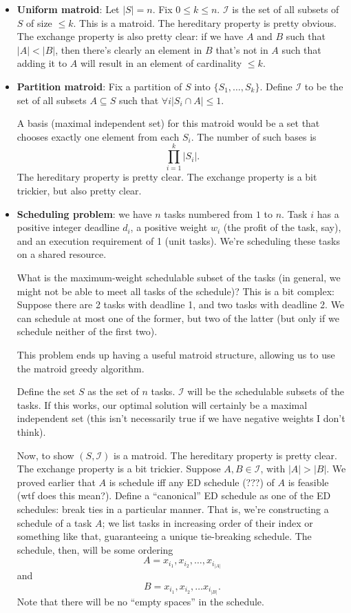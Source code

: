 \documentclass{article}
\begin{document}
\begin{itemize}
	\item \textbf{Uniform matroid}: Let $|S| = n$. 
	Fix $0\leq k \leq n$.
	$\mathcal I$ is the set of all subsets of $S$ of size $\leq k$.
	This is a matroid.
	The hereditary property is pretty obvious.
	The exchange property is also pretty clear: if we have $A$ and $B$
	such that $|A| < |B|$, then there's clearly an element in $B$ that's
	not in $A$ such that adding it to $A$ will result in an element of 
	cardinality $\leq k$.
	
	
	\item
	\textbf{Partition matroid}: 
	Fix a partition of $S$ into $\{S_1,\ldots, S_k\}$.
	Define $\mathcal I$ to be the set of all subsets $A\subseteq S$
	such that $\forall i |S_i\cap A| \leq 1$.
	
	A basis (maximal independent set) for this matroid
	would be a set that chooses exactly one element from each $S_i$.
	The number of such bases is
	$$
	\prod_{i=1}^k |S_i|.
	$$
	The hereditary property is pretty clear.
	The exchange property is a bit trickier, but also pretty clear.
	
	\item
	\textbf{Scheduling problem}: we have $n$ tasks
	numbered from $1$ to $n$.
	Task $i$ has a positive integer deadline $d_i$, a positive weight
	$w_i$ (the profit of the task, say), and an execution requirement
	of 1 (unit tasks). We're scheduling these tasks on a shared resource.
	
	What is the maximum-weight schedulable subset of the tasks (in general,
	we might not be able to meet all tasks of the schedule)?
	This is a bit complex: Suppose there are 2 tasks with deadline 1, 
	and two tasks with deadline 2. We can schedule
	at most one of the former, but two of the latter (but only if we
	schedule neither of the first two).
	
	This problem ends up having a useful matroid structure, allowing us to
	use the matroid greedy algorithm.
	
	Define the set $S$ as the set of $n$ tasks.
	$\mathcal I$ will be the schedulable subsets of the tasks.
	If this works, our optimal solution will certainly be a maximal 
	independent set (this isn't necessarily true if we have negative
	weights I don't think).
	
	Now, to show $(S,\mathcal I)$ is a matroid. The hereditary property
	is pretty clear.
	The exchange property is a bit trickier.
	Suppose $A,B\in\mathcal I$, with $|A| > |B|$.
	We proved earlier that $A$ is schedule iff any ED schedule (???) of
	$A$ is feasible (wtf does this mean?).
	Define a ``canonical'' ED schedule as one of the ED schedules: break
	ties in a particular manner.
	That is, we're constructing a schedule of a task $A$; we list tasks
	in increasing order of their index or something like that, guaranteeing
	a unique tie-breaking schedule.
	The schedule, then, will be some ordering
	$$
	A = x_{i_1}, x_{i_2}, \ldots, x_{i_{|A|}}
	$$
	and
	$$
	B = x_{i_1}, x_{i_2}, \ldots x_{i_{|B|}}.
	$$
	Note that there will be no ``empty spaces'' in the schedule.
	

\end{itemize}
\end{document}
